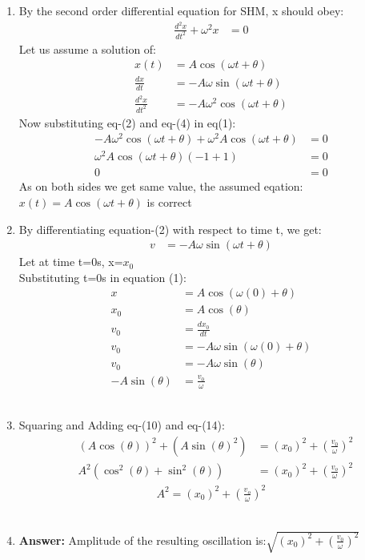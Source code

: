 \documentclass[journal,12pt,twocolumn]{IEEEtran}
\theoremstyle{remark}
\begin{document}
\begin{enumerate}
\\
\item{}
By the second order differential equation for SHM, x should obey:
\begin{align}
    \frac{d^2x}{dt^2} + \omega^2 x &= 0
\end{align}
Let us assume a solution of:
\begin{align}
    x(t) &= A \cos(\omega t + \theta)\\
    \frac{dx}{dt} &= -A \omega \sin(\omega t + \theta)\\
    \frac{d^2x}{dt^2} &= -A \omega^2 \cos(\omega t + \theta)
  \end{align}
Now substituting eq-(2) and eq-(4) in eq(1):
\begin{align}
    -A \omega^2 \cos(\omega t + \theta) + \omega^2 A \cos(\omega t + \theta) &= 0\\
    \omega^2 A \cos(\omega t + \theta) \left(-1 + 1\right) &= 0\\
    0 &= 0
\end{align}
As on both sides we get same value, the assumed eqation:\\$ x(t)= A \cos(\omega t + \theta)$ is correct
\\
\item{}
By differentiating equation-(2) with respect to time t,
we get:
\begin{align}
v&=-A\omega{}\sin(\omega{t}+\theta{})  
\end{align}
Let at time t=0s, x=$x_0$\\
Substituting t=0s in equation (1):
\begin{align}
x&=A\cos(\omega{(0)}+\theta{})\\
x_0&=A\cos(\theta{})\\
v_0&=\frac{dx_0}{dt}\\
v_0&=-A\omega{}\sin(\omega{(0)}+\theta{})\\
v_0&=-A\omega{}\sin(\theta{})\\
-A\sin(\theta{})&=\frac{v_0}{\omega{}}
\end{align}\\
\item{}
Squaring and Adding eq-(10) and eq-(14):\\
\begin{align}
&(A\cos(\theta{}))^2+(A\sin(\theta{})^2)
&=(x_0)^2+\left(\frac{v_0}{\omega{}}\right)^2\\
&A^2(\cos^2(\theta{})+\sin^2(\theta{}))
&=(x_0)^2+\left(\frac{v_o}{\omega{}}\right)^2\end{align}
\begin{align}
A^2=(x_0)^2+(\frac{v_o}{\omega{}})^2
\end{align}\\
\item \textbf{Answer:}
Amplitude of the resulting oscillation is:$\sqrt{(x_0)^2+(\frac{v_0}{\omega{}})^2}$
\end{enumerate}
\end{document}
